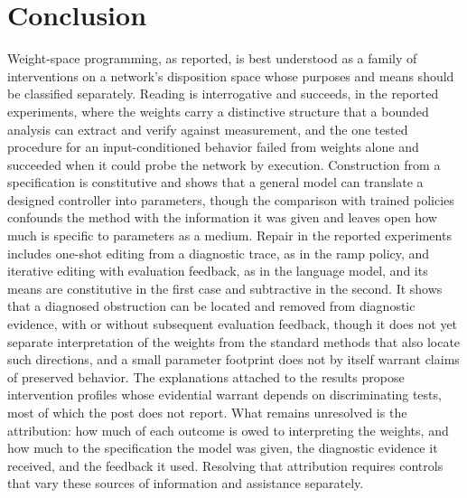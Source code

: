 \documentclass[11pt]{article}
\begin{document}
\section{Conclusion}

Weight-space programming, as reported, is best understood as a family of interventions on a network's disposition space whose purposes and means should be classified separately. Reading is interrogative and succeeds, in the reported experiments, where the weights carry a distinctive structure that a bounded analysis can extract and verify against measurement, and the one tested procedure for an input-conditioned behavior failed from weights alone and succeeded when it could probe the network by execution. Construction from a specification is constitutive and shows that a general model can translate a designed controller into parameters, though the comparison with trained policies confounds the method with the information it was given and leaves open how much is specific to parameters as a medium. Repair in the reported experiments includes one-shot editing from a diagnostic trace, as in the ramp policy, and iterative editing with evaluation feedback, as in the language model, and its means are constitutive in the first case and subtractive in the second. It shows that a diagnosed obstruction can be located and removed from diagnostic evidence, with or without subsequent evaluation feedback, though it does not yet separate interpretation of the weights from the standard methods that also locate such directions, and a small parameter footprint does not by itself warrant claims of preserved behavior. The explanations attached to the results propose intervention profiles whose evidential warrant depends on discriminating tests, most of which the post does not report. What remains unresolved is the attribution: how much of each outcome is owed to interpreting the weights, and how much to the specification the model was given, the diagnostic evidence it received, and the feedback it used. Resolving that attribution requires controls that vary these sources of information and assistance separately.
\end{document}
